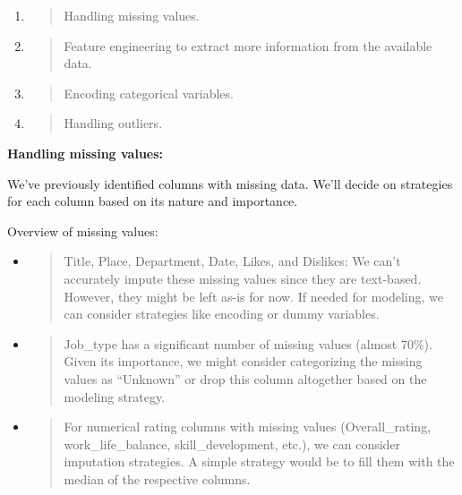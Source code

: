 \documentclass[
]{article}
\begin{document}
\begin{enumerate}
\def\labelenumi{\arabic{enumi}.}
\item
  \begin{quote}
  Handling missing values.
  \end{quote}
\item
  \begin{quote}
  Feature engineering to extract more information from the available
  data.
  \end{quote}
\item
  \begin{quote}
  Encoding categorical variables.
  \end{quote}
\item
  \begin{quote}
  Handling outliers.
  \end{quote}
\end{enumerate}

\textbf{Handling missing values:}

We've previously identified columns with missing data. We'll decide on
strategies for each column based on its nature and importance.

Overview of missing values:

\begin{itemize}
\item
  \begin{quote}
  Title, Place, Department, Date, Likes, and Dislikes: We can't
  accurately impute these missing values since they are text-based.
  However, they might be left as-is for now. If needed for modeling, we
  can consider strategies like encoding or dummy variables.
  \end{quote}
\item
  \begin{quote}
  Job\_type has a significant number of missing values (almost 70\%).
  Given its importance, we might consider categorizing the missing
  values as ``Unknown'' or drop this column altogether based on the
  modeling strategy.
  \end{quote}
\item
  \begin{quote}
  For numerical rating columns with missing values (Overall\_rating,
  work\_life\_balance, skill\_development, etc.), we can consider
  imputation strategies. A simple strategy would be to fill them with
  the median of the respective columns.
  \end{quote}
\end{itemize}
\end{document}
